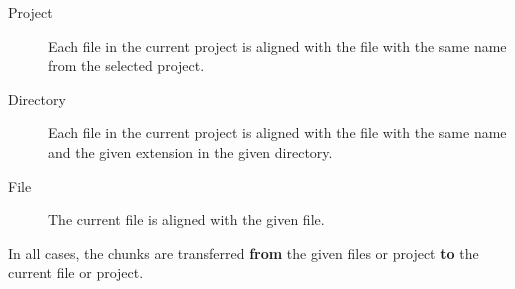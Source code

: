 \documentclass{article}
\begin{document}
\begin{description}
\item[Project] Each file in the current project is aligned with the
file with the same name from the selected project.
\item[Directory] Each file in the current project is aligned with the
file with the same name and the given extension in the given
directory.
\item[File] The current file is aligned with the given file.
\end{description}

In all cases, the chunks are transferred \textbf{from} the given files
or project \textbf{to} the current file or project.



\end{document}
